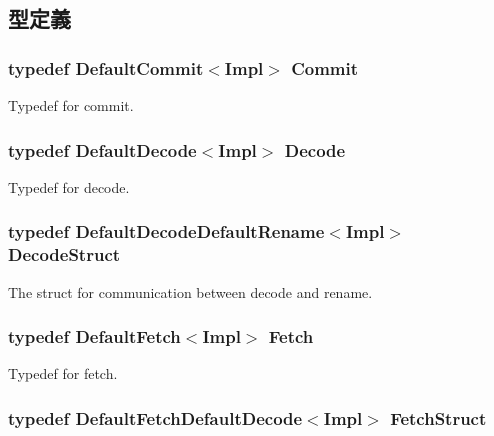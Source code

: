 \subsection{型定義}
\hypertarget{structSimpleCPUPolicy_af339740e93470f7eee7d2ef7beb245e0}{
\subsubsection[{Commit}]{\setlength{\rightskip}{0pt plus 5cm}typedef {\bf DefaultCommit}$<$Impl$>$ {\bf Commit}}}
\label{structSimpleCPUPolicy_af339740e93470f7eee7d2ef7beb245e0}
Typedef for commit. \hypertarget{structSimpleCPUPolicy_aca5dda7cc17827acd2748d7228838ede}{
\subsubsection[{Decode}]{\setlength{\rightskip}{0pt plus 5cm}typedef {\bf DefaultDecode}$<$Impl$>$ {\bf Decode}}}
\label{structSimpleCPUPolicy_aca5dda7cc17827acd2748d7228838ede}
Typedef for decode. \hypertarget{structSimpleCPUPolicy_ab1ad5de48172f26d3eef9c002888156f}{
\subsubsection[{DecodeStruct}]{\setlength{\rightskip}{0pt plus 5cm}typedef {\bf DefaultDecodeDefaultRename}$<$Impl$>$ {\bf DecodeStruct}}}
\label{structSimpleCPUPolicy_ab1ad5de48172f26d3eef9c002888156f}
The struct for communication between decode and rename. \hypertarget{structSimpleCPUPolicy_aa3e1cec2212c5a44abfb8c9751a04b5b}{
\subsubsection[{Fetch}]{\setlength{\rightskip}{0pt plus 5cm}typedef {\bf DefaultFetch}$<$Impl$>$ {\bf Fetch}}}
\label{structSimpleCPUPolicy_aa3e1cec2212c5a44abfb8c9751a04b5b}
Typedef for fetch. \hypertarget{structSimpleCPUPolicy_a84cf84b07d04291ab6f09af9855f5e30}{
\subsubsection[{FetchStruct}]{\setlength{\rightskip}{0pt plus 5cm}typedef {\bf DefaultFetchDefaultDecode}$<$Impl$>$ {\bf FetchStruct}}}
